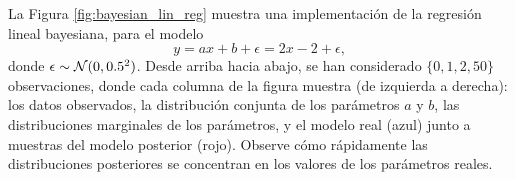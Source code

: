 \begin{mdframed}[style=ejemplo, frametitle={\center Ejemplo: distribución posterior del modelo lineal y gaussiano}]
\noindent
\begin{minipage}[t]{0.32\textwidth}
\vspace{2em}
La Figura \ref{fig:bayesian_lin_reg}  muestra una implementación de la regresión lineal bayesiana, para el modelo 
\begin{equation}
	y = ax + b + \epsilon= 2x-2	+ \epsilon,
\end{equation}
donde $\epsilon\sim{\mathcal N}(0,0.5^2)$. Desde arriba hacia abajo, se han considerado $\{0,1,2,50\}$ observaciones, donde  cada columna de la figura muestra (de izquierda a derecha): los datos observados, la distribución conjunta de los parámetros $a$ y $b$, las distribuciones marginales de los parámetros, y el modelo real (azul) junto a muestras del modelo posterior (rojo). Observe cómo rápidamente las distribuciones posteriores se concentran en los valores de los parámetros reales. 
\end{minipage}\hfill
\begin{minipage}[t]{0.65\textwidth}


\end{minipage}
\end{mdframed}
